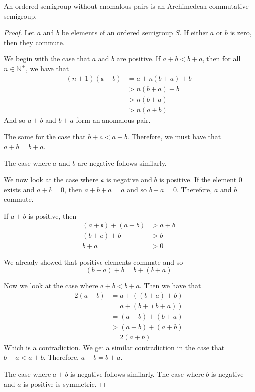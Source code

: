\begin{theorem}
An ordered semigroup without anomalous pairs is an Archimedean commutative semigroup.
\end{theorem}
\begin{proof}
Let $a$ and $b$ be elements of an ordered semigroup $S$.
If either $a$ or $b$ is zero, then they commute.

We begin with the case that $a$ and $b$ are positive.
If $a + b < b + a$, then for all $n\in \mathbb{N}^+$, we have that
\begin{align}
(n+1)(a+b) &= a + n(b+a) + b \\
&> n(b+a) + b \\
&> n(b+a) \\
&> n(a+b)
\end{align}
And so $a+b$ and $b+a$ form an anomalous pair.

The same for the case that $b + a < a + b$.
Therefore, we must have that $a+b = b+a$.

The case where $a$ and $b$ are negative follows similarly.

We now look at the case where $a$ is negative and $b$ is positive.
If the element $0$ exists and $a+b = 0$, then $a + b + a = a$ and so $b+a = 0$.
Therefore, $a$ and $b$ commute.

If $a + b$ is positive, then
\begin{align}
(a+b) + (a+b) &> a + b \\
(b + a) + b &> b \\
b + a &> 0
\end{align}

We already showed that positive elements commute and so
\[ (b+a) + b = b + (b + a)\]

Now we look at the case where $a+b < b+a$.
Then we have that
\begin{align}
2(a + b) &= a + ((b+a) + b) \\
&= a + (b + (b + a)) \\
&= (a + b) + (b + a) \\
&> (a + b) + (a + b) \\
&= 2(a + b)
\end{align}
Which is a contradiction.
We get a similar contradiction in the case that $b+a < a+b$.
Therefore, $a+b = b+a$.

The case where $a+b$ is negative follows similarly.
The case where $b$ is negative and $a$ is positive is symmetric.
\end{proof}